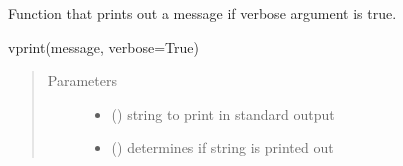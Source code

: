\documentclass[letterpaper,10pt,english,openany,oneside]{sphinxmanual}
\begin{document}

\begin{fulllineitems}
\label{\detokenize{pygpc:pygpc.misc.vprint}}
Function that prints out a message if verbose argument is true.

vprint(message, verbose=True)
\begin{quote}\begin{description}
\item[{Parameters}] \leavevmode\begin{itemize}
\item {} 
 () \textendash{} string to print in standard output

\item {} 
 (\sphinxstyleliteralemphasis{\sphinxupquote{, }}\sphinxstyleliteralemphasis{\sphinxupquote{, }}) \textendash{} determines if string is printed out

\end{itemize}

\end{description}\end{quote}

\end{fulllineitems}

\end{document}
